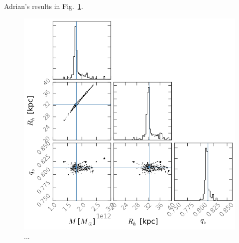Adrian's results in Fig.~\ref{apw_pal5}.
\begin{figure}
\includegraphics[width=168mm]{figures/apw_pal5.png}
  \caption{...}
  \label{apw_pal5}
\end{figure}
